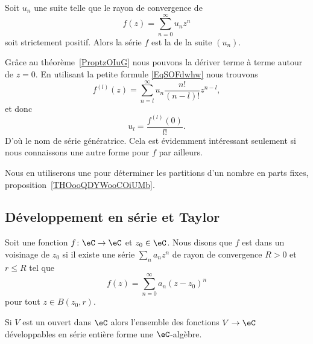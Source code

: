 Soit \( u_n\) une suite telle que le rayon de convergence de
\begin{equation}
	f(z)=\sum_{n=0}^{\infty}u_nz^n
\end{equation}
soit strictement positif. Alors la série \( f\) est la  de la suite \( (u_n)\).

Grâce au théorème~\ref{ProptzOIuG} nous pouvons la dériver terme à terme autour de \( z=0\). En utilisant la petite formule \eqref{EqSOFdwhw} nous trouvons
\begin{equation}    \label{EqNGhVCpP}
	f^{(l)}(z)=\sum_{n=l}^{\infty}u_n\frac{ n! }{ (n-l)! }z^{n-l},
\end{equation}
et donc
\begin{equation}
	u_l=\frac{ f^{(l)}(0) }{ l! }.
\end{equation}
D'où le nom de série génératrice. Cela est évidemment intéressant seulement si nous connaissons une autre forme pour \( f\) par ailleurs.

Nous en utiliserons une pour déterminer les partitions d'un nombre en parts fixes, proposition~\ref{THOooQDYWooCOiUMb}.

\subsection{Développement en série et Taylor}

\begin{definition}  \label{DefwmRzKh}
	Soit une fonction \( f\colon \eC\to \eC\) et \( z_0\in \eC\). Nous disons que \( f\) est  dans un voisinage de \( z_0\) si il existe une série \( \sum_n a_nz^n\) de rayon de convergence \( R>0\) et \( r\leq R\) tel que
	\begin{equation}
		f(z)=\sum_{n=0}^{\infty}a_n(z-z_0)^n
	\end{equation}
	pour tout \( z\in B(z_0,r)\).
\end{definition}

\begin{proposition}
	Si \( V\) est un ouvert dans \( \eC\) alors l'ensemble des fonctions \( V\to \eC\) développables en série entière forme une \( \eC\)-algèbre.
\end{proposition}


